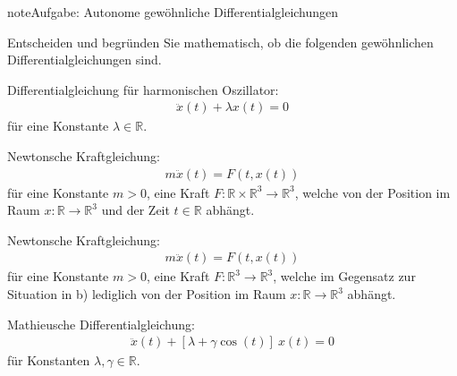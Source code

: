 \documentclass[letterpaper,10pt,german]{jupyterBook}
\begin{document}
\begin{sphinxadmonition}{note}{Aufgabe: Autonome gewöhnliche Differentialgleichungen}

\sphinxAtStartPar
Entscheiden und begründen Sie mathematisch, ob die folgenden gewöhnlichen Differentialgleichungen  sind.

\sphinxAtStartPar
{} Differentialgleichung für harmonischen Oszillator:
\begin{equation*}
\begin{split}\ddot x(t) + \lambda x(t) = 0\end{split}
\end{equation*}
\sphinxAtStartPar
für eine Konstante \(\lambda \in \mathbb{R}\).

\sphinxAtStartPar
{} Newtonsche Kraftgleichung:
\begin{equation*}
\begin{split}m \ddot x(t) = F(t, x(t))\end{split}
\end{equation*}
\sphinxAtStartPar
für eine Konstante \(m > 0\), eine Kraft \(F: \mathbb{R} \times \mathbb{R}^3 \rightarrow \mathbb{R}^3\), welche von der Position im Raum \(x: \mathbb{R} \rightarrow \mathbb{R}^3\) und der Zeit \(t \in \mathbb{R}\) abhängt.

\sphinxAtStartPar
{} Newtonsche Kraftgleichung:
\begin{equation*}
\begin{split}m \ddot x(t) = F(t, x(t))\end{split}
\end{equation*}
\sphinxAtStartPar
für eine Konstante \(m > 0\), eine Kraft \(F: \mathbb{R}^3 \rightarrow \mathbb{R}^3\), welche im Gegensatz zur Situation in b) lediglich von der Position im Raum \(x: \mathbb{R} \rightarrow \mathbb{R}^3\) abhängt.

\sphinxAtStartPar
{} Mathieusche Differentialgleichung:
\begin{equation*}
\begin{split}\ddot x(t) + [\lambda + \gamma \cos(t)] ~ x(t) = 0\end{split}
\end{equation*}
\sphinxAtStartPar
für Konstanten \(\lambda, \gamma \in \mathbb{R}\).
\end{sphinxadmonition}
\end{document}
